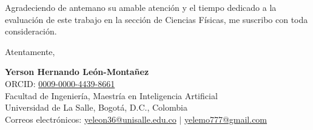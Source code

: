 \documentclass[11pt,a4paper]{article}
\begin{document}
Agradeciendo de antemano su amable atención y el tiempo dedicado a la evaluación de este trabajo en la sección de Ciencias Físicas, me suscribo con toda consideración.

\vspace{0.8cm}

\noindent Atentamente,

\vspace{0.9cm}

\noindent\textbf{Yerson Hernando León-Montañez}\\
ORCID: \href{https://orcid.org/0009-0000-4439-8661}{0009-0000-4439-8661}\\
Facultad de Ingeniería, Maestría en Inteligencia Artificial\\
Universidad de La Salle, Bogotá, D.C., Colombia\\
Correos electrónicos: \href{mailto:yeleon36@unisalle.edu.co}{yeleon36@unisalle.edu.co} $|$ \href{mailto:yelemo777@gmail.com}{yelemo777@gmail.com}
\end{document}
